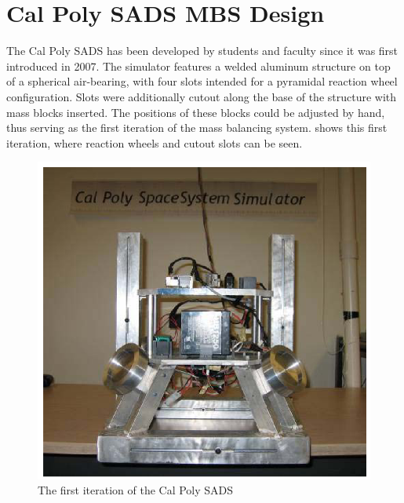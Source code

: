 \section{Cal Poly SADS MBS Design} 

The Cal Poly SADS has been developed by students and faculty since it was first introduced in 2007. The simulator features a welded aluminum structure on top of a spherical air-bearing, with four slots intended for a pyramidal reaction wheel configuration. Slots were additionally cutout along the base of the structure with mass blocks inserted. The positions of these blocks could be adjusted by hand, thus serving as the first iteration of the mass balancing system.  shows this first iteration, where reaction wheels and cutout slots can be seen.
\begin{figure}[h]\label{fig:V1}
    \centering
    \includegraphics[width=0.80\linewidth]{figures/SADS_V1.PNG}
    \caption{The first iteration of the Cal Poly SADS \cite{mittelsteadt_cal_2007}}
\end{figure}

